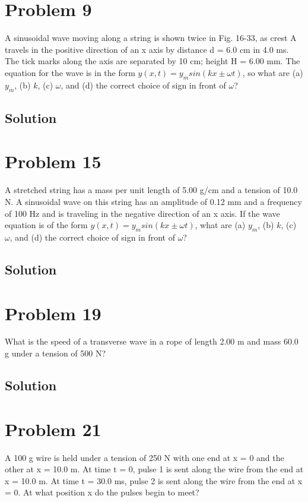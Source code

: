 \documentclass[12pt]{article}
\begin{document}
    \section{Problem 9}
        A sinusoidal wave moving along a string is shown twice in Fig. 16-33, as crest A travels in the positive direction of an x axis by distance d = 6.0 cm in 4.0 ms. 
        The tick marks along the axis are separated by 10 cm; height H = 6.00 mm.
        The equation for the wave is in the form $y(x, t) = y_m sin(kx \pm \omega t)$, so what are (a) $y_m$, (b) $k$, (c) $\omega$, and (d) the correct choice of sign in front of $\omega$?

        \subsection{Solution}

    \section{Problem 15}
        A stretched string has a mass per unit length of 5.00 g/cm and a tension of 10.0 N. 
        A sinusoidal wave on this string has an amplitude of 0.12 mm and a frequency of 100 Hz and is traveling in the negative direction of an x axis. 
        If the wave equation is of the form $y(x, t) = y_m sin(kx \pm \omega t)$, what are (a) $y_m$, (b) $k$, (c) $\omega$, and (d) the correct choice of sign in front of $\omega$?

        \subsection{Solution}

    \section{Problem 19}
        What is the speed of a transverse wave in a rope of length 2.00 m and mass 60.0 g under a tension of 500 N?

        \subsection{Solution}

    \section{Problem 21}
        A 100 g wire is held under a tension of 250 N with one end at x = 0 and the other at x = 10.0 m. 
        At time t = 0, pulse 1 is sent along the wire from the end at x = 10.0 m. 
        At time t = 30.0 ms, pulse 2 is sent along the wire from the end at x = 0. 
        At what position x do the pulses begin to meet?
\end{document}
